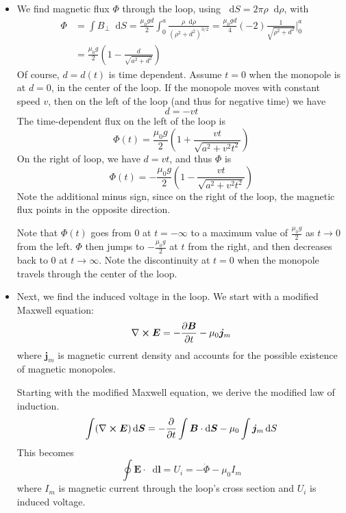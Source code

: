 \documentclass[11pt, a4paper]{article}
\newcommand{\diff}{\mathop{}\!\mathrm{d}} %
\renewcommand{\vec}[1]{\bm{#1}} %
\newcommand{\E}{\vec{E}} %
\newcommand{\B}{\vec{B}} %
\newcommand{\mm}{\mu_{0}}  %
\newcommand{\m}{\vec{m}} %
\renewcommand{\curl}{\nabla \cross}
\begin{document}
\begin{itemize}
	\item We find magnetic flux $ \Phi $ through the loop, using $  \diff S = 2\pi \rho \diff \rho $, with
	\begin{align*}
		\Phi &= \int B_{\perp} \diff S = \frac{\mm g d}{2} \int_{0}^{a} \frac{\rho \diff \rho}{(\rho^{2} + d^{2})^{3/2}} = \frac{\mm g d}{4}(-2)\frac{1}{\sqrt{\rho^{2} + d^{2}}}\bigg |_{0}^{a}\\
		& = \frac{\mm g}{2}\left(1 - \frac{d}{\sqrt{a^{2} + d^{2}}}\right)
	\end{align*}
	Of course, $ d = d(t) $ is time dependent. Assume $ t = 0 $ when the monopole is at $ d = 0 $, in the center of the loop. If the monopole moves with constant speed $ v $, then on the left of the loop (and thus for negative time) we have
	\begin{equation*}
		d = - vt
	\end{equation*}
	The time-dependent flux on the left of the loop is
	\begin{equation*}
		\Phi(t) = \frac{\mm g}{2}\left(1 + \frac{vt}{\sqrt{a^{2} +v^{2}t^{2}}}\right)
	\end{equation*}
	On the right of loop, we have $ d = vt $, and thus $ \Phi $ is
	\begin{equation*}
		\Phi(t) = -\frac{\mm g}{2}\left(1 - \frac{vt}{\sqrt{a^{2} +v^{2}t^{2}}}\right)
	\end{equation*}
	Note the additional minus sign, since on the right of the loop, the magnetic flux points in the opposite direction.
	
	Note that $ \Phi(t) $ goes from $ 0 $ at $ t = -\infty $ to a maximum value of $ \frac{\mm g}{2} $ as $ t \to 0 $ from the left. $ \Phi $ then jumps to $ - \frac{\mm g}{2}  $ at $ t  $ from the right, and then decreases back to 0 at $ t \to \infty $. Note the discontinuity at $ t = 0 $ when the monopole travels through the center of the loop.
	
	\item Next, we find the induced voltage in the loop. We start with a modified Maxwell equation:
	\begin{equation*}
		\curl \E = - \pdv{\B}{t} - \mm \vec{j}_{m}
	\end{equation*}
	where $ \vec{j}_{m} $ is magnetic current density and accounts for the possible existence of magnetic monopoles. 
	
	Starting with the modified Maxwell equation, we derive the modified law of induction. 
	\begin{equation*}
		\int (\curl \E)\diff \vec{S} = - \pdv{t}\int \B \cdot \diff \vec{S} - \mm \int \vec{j}_{m}\diff S 
	\end{equation*}
	This becomes
	\begin{equation*}
		\oint \E \cdot \diff \vec{l} = U_{i} = - \dot{\Phi} - \mm I_{m}
	\end{equation*}
	where $ I_{m} $ is magnetic current through the loop's cross section and $ U_{i} $ is induced voltage. 
	

\end{itemize}
\end{document}
